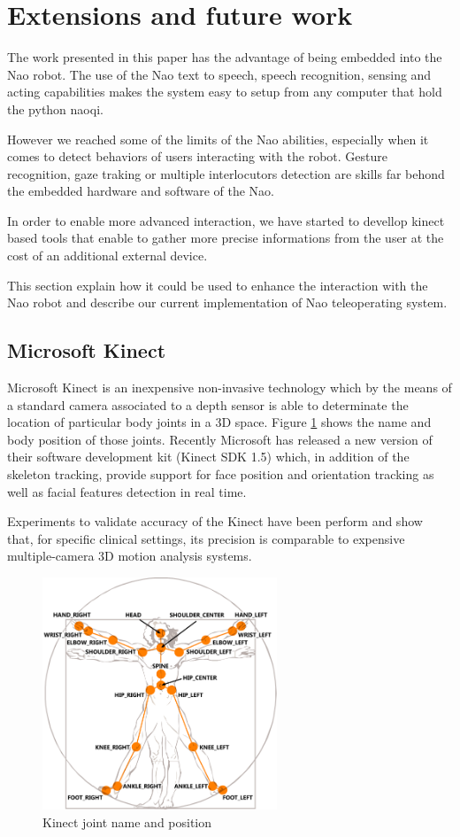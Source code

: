 \documentclass[a4paper,11pt]{article}
\begin{document}
\section{Extensions and future work}

The work presented in this paper has the advantage of being embedded into the Nao robot. The use of the Nao text to speech, speech recognition, sensing and acting capabilities makes the system easy to setup from any computer that hold the python naoqi.

However we reached some of the limits of the Nao abilities, especially when it comes to detect behaviors of users interacting with the robot. Gesture recognition, gaze traking or multiple interlocutors detection are skills far behond the embedded hardware and software of the Nao.

In order to enable more advanced interaction, we have started to devellop kinect based tools that enable to gather more precise informations from the user at the cost of an additional external device.

This section explain how it could be used to enhance the interaction with the Nao robot and describe our current implementation of Nao teleoperating system. 

\subsection{Microsoft Kinect}

Microsoft Kinect \cite{leyvand2011kinect} is an inexpensive non-invasive technology which by the means of a standard camera associated to a depth sensor is able to determinate the location of particular body joints in a 3D space. Figure \ref{KinectJoint} shows the name and body position of those joints. Recently Microsoft has released a new version of their software development kit (Kinect SDK 1.5) which, in addition of the skeleton tracking, provide support for face position and orientation tracking as well as facial features detection in real time.

Experiments to validate accuracy of the Kinect have been perform  \cite{clark2012validity} and show that, for specific clinical settings, its precision is comparable to expensive multiple-camera 3D motion analysis systems.

\begin{figure}[H]
	\centering
	\includegraphics[width=7cm]{jointssquelette.png}
	\caption{Kinect joint name and position}
	\label{KinectJoint}
\end{figure}
\end{document}
